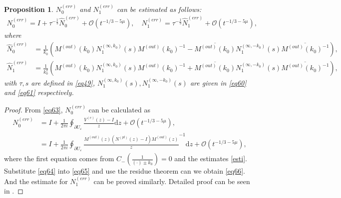 \documentclass[11pt]{article}
\numberwithin{equation}{section}
\newtheorem{Proposition}{Proposition}
\begin{document}
\begin{Proposition}\label{p27}
    $N^{(err)}_0$ and $N^{(err)}_1$ can be estimated as follows:
    \begin{align}
        N^{(err)}_0=I+\tau^{-\frac{1}{3}}\widehat N^{(err)}_0+\mathcal{O}(t^{-1/3-5\mu    }),\quad N^{(err)}_1=\tau^{-\frac{1}{3}}\widehat N^{(err)}_1+\mathcal{O}(t^{-1/3-5\mu    }),\label{eq66}
    \end{align}
    where
     \begin{align*}
        \widehat N^{(err)}_0&=\frac{1}{k_0} \left(M^{(out)}(k_0)N^{(\infty,k_0)}_1(s)M^{(out)}(k_0)^{-1}
        -\overline{M^{(out)}(k_0)}N^{(\infty,-k_0)}_1(s)\overline{M^{(out)}(k_0)^{-1}}\right),\\
        \widehat N^{(err)}_1&=\frac{1}{k_0^2}\left(M^{(out)}(k_0)N^{(\infty,k_0)}_1(s)M^{(out)}(k_0)^{-1}+\overline{M^{(out)}(k_0)}N^{(\infty,-k_0)}_1(s)\overline{M^{(out)}(k_0)^{-1}}\right),
     \end{align*}
      with $\tau,s$ are defined in \eqref{eq49}, $N^{(\infty,k_0)}_1(s),N^{(\infty,-k_0)}_1(s)$ are given in \eqref{eq60} and \eqref{eq61} respectively.
\end{Proposition}
\begin{proof}
From \eqref{eq63}, $N^{(err)}_0$ can be calculated as
\begin{align}
    N^{(err)}_0&=I + \frac{1}{2\pi i} \oint_{\partial U_\varepsilon} \frac{ V^{(e)}(z)-I}{z} \mathrm{d}z + \mathcal{O}(t^{-1/3-5\mu       }),\\
    &=I+\frac{1}{2\pi i} \oint_{\partial U_\varepsilon} \frac{M^{(out)}(z) \left(N^{(pl)}(z)-I\right)M^{(out)}(z)}{z}^{-1} \mathrm{d}z + \mathcal{O}(t^{-1/3-5\mu    }),\label{eq65}
\end{align}
where the first equation comes from $C_-\left(\frac{1}{(\cdot)\pm k_0}\right)=0$ and the estimates \eqref{esti}. Substitute \eqref{eq64} into \eqref{eq65} and use the residue theorem can we obtain \eqref{eq66}. And the estimate for $N^{(err)}_1$ can be proved similarly. Detailed proof can be seen in \cite{xyz}.
\end{proof}
\end{document}
